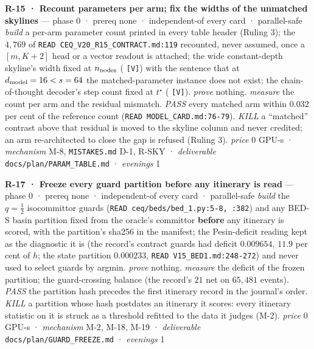 \documentclass[11pt,a4paper]{article}
\newcounter{none}                 %
\theoremstyle{plain}
\theoremstyle{definition}
\theoremstyle{remark}
\begin{document}
\textbf{R-15 · Recount parameters per arm; fix the widths of the
unmatched skylines} --- phase 0 · prereq none · independent-of every
card · parallel-safe \emph{build} a per-arm parameter count printed in
every table header (Ruling 3); the \(4{,}769\) of
\texttt{READ\ CEQ\_V20\_R15\_CONTRACT.md:119} recounted, never assumed,
once a \([m,K+2]\) head or a vector readout is attached; the wide
constant-depth skyline's width fixed at \(n_{\rm nodes}\)
(\citep{yehudai-2025-depthwidth} \texttt{{[}V{]}}) with the sentence
that at \(d_{\rm model}=16<s=64\) the matched-parameter instance does
not exist; the chain-of-thought decoder's step count fixed at
\(t^\star\) (\citep{merrill-2024-cot} \texttt{{[}V{]}}). \emph{prove}
nothing. \emph{measure} the count per arm and the residual mismatch.
\emph{PASS} every matched arm within \(0.032\) per cent of the reference
count (\texttt{READ\ MODEL\_CARD.md:76-79}). \emph{KILL} a ``matched''
contrast above that residual is moved to the skyline column and never
credited; an arm re-architected to close the gap is refused (Ruling 3).
\emph{price} \(0\) GPU-s · \emph{mechanism} M-8, \texttt{MISTAKES.md}
D-1, R-SKY · \emph{deliverable} \texttt{docs/plan/PARAM\_TABLE.md} ·
\emph{evenings} 1

\textbf{R-17 · Freeze every guard partition before any itinerary is
read} --- phase 0 · prereq none · independent-of every card ·
parallel-safe \emph{build} the \(q=\tfrac12\) isocommittor guards
(\texttt{READ\ ceq/beds/bed\_1.py:5-8,\ :382}) and any BED-S basin
partition fixed from the oracle's committor \textbf{before} any
itinerary is scored, with the partition's sha256 in the manifest; the
Pesin-deficit reading kept as the diagnostic it is (the record's
contract guards had deficit \(0.009654\), \(11.9\) per cent of \(h\);
the state partition \(0.000233\), \texttt{READ\ V15\_BED1.md:248-272})
and never used to select guards by argmin. \emph{prove} nothing.
\emph{measure} the deficit of the frozen partition; the guard-crossing
balance (the record's \(21\) net on \(65{,}481\) events). \emph{PASS}
the partition hash precedes the first itinerary record in the journal's
order. \emph{KILL} a partition whose hash postdates an itinerary it
scores: every itinerary statistic on it is struck as a threshold
refitted to the data it judges (M-2). \emph{price} \(0\) GPU-s ·
\emph{mechanism} M-2, M-18, M-19 · \emph{deliverable}
\texttt{docs/plan/GUARD\_FREEZE.md} · \emph{evenings} 1
\end{document}
